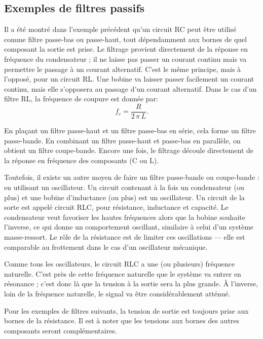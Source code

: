 \documentclass[canadien,12pt,oneside,letterpaper]{article}
\begin{document}
\subsection{Exemples de filtres passifs}

Il a été montré dans l'exemple précédent qu'un circuit RC peut être utilisé comme filtre passe-bas ou passe-haut, tout dépendamment aux bornes de quel composant la sortie est prise. Le filtrage provient directement de la réponse en fréquence du condensateur ; il ne laisse pas passer un courant continu mais va permettre le passage à un courant alternatif. C'est le même principe, mais à l'opposé, pour un circuit RL. Une bobine va laisser passer facilement un courant continu, mais elle s'opposera au passage d'un courant alternatif. Dans le cas d'un filtre RL, la fréquence de coupure est donnée par:
\begin{equation}
f_c=\frac{R}{2\,\pi\,L}.
\end{equation}

En plaçant un filtre passe-haut et un filtre passe-bas en série, cela forme un filtre passe-bande. En combinant un filtre passe-haut et passe-bas en parallèle, on obtient un filtre coupe-bande. Encore une fois, le filtrage découle directement de la réponse en fréquence des composants (C ou L).

Toutefois, il existe un autre moyen de faire un filtre passe-bande ou coupe-bande : en utilisant un oscillateur. Un circuit contenant à la fois un condensateur (ou plus) et une bobine d'inductance (ou plus) est un oscillateur. Un circuit de la sorte est appelé circuit RLC, pour résistance, inductance et capacité. Le condensateur veut favoriser les hautes fréquences alors que la bobine souhaite l'inverse, ce qui donne un comportement oscillant, similaire à celui d'un système masse-ressort. Le rôle de la résistance est de limiter ces oscillations --- elle est comparable au frottement dans le cas d'un oscillateur mécanique.

Comme tous les oscillateurs, le circuit RLC a une (ou plusieurs) fréquence naturelle. C'est près de cette fréquence naturelle que le système va entrer en résonance ; c'est donc là que la tension à la sortie sera la plus grande. À l'inverse, loin de la fréquence naturelle, le signal va être considérablement atténué.

Pour les exemples de filtres suivants, la tension de sortie est toujours prise aux bornes de la résistance. Il est à noter que les tensions aux bornes des autres composants seront complémentaires.
\end{document}
